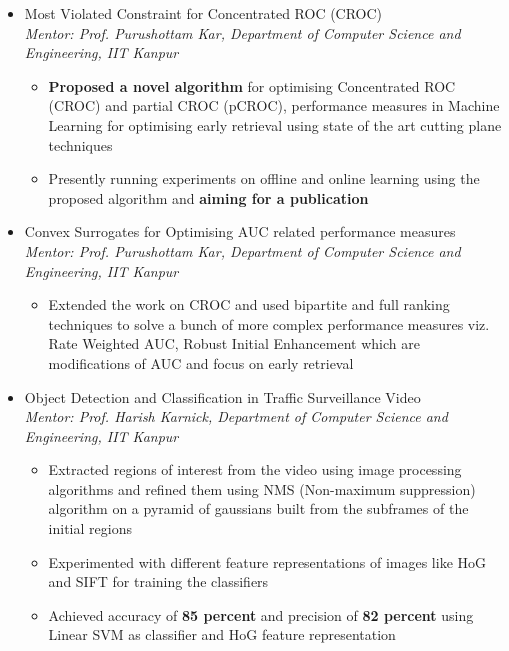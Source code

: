 \documentclass{article}
\begin{document}
\renewcommand{\labelitemii}{$\bullet$}
\begin{itemize}[leftmargin=0.07cm]
\item[] {\large Most Violated Constraint for Concentrated ROC (CROC)}\hspace*{\fill}\\
\emph{Mentor: Prof. Purushottam Kar, Department of Computer Science and Engineering, IIT Kanpur
}	\begin{itemize}
	\item \textbf{Proposed a novel algorithm} for optimising Concentrated ROC (CROC) and partial CROC (pCROC), performance measures in Machine Learning for optimising early retrieval using state of the art cutting plane techniques
	\item Presently running experiments on offline and online learning using the proposed algorithm and \textbf{aiming for a publication}
	\end{itemize}
\end{itemize}\begin{itemize}[leftmargin=0.07cm]
\item[] {\large Convex Surrogates for Optimising AUC related performance measures}\hspace*{\fill}\\
\emph{Mentor: Prof. Purushottam Kar, Department of Computer Science and Engineering, IIT Kanpur
}	\begin{itemize}
	\item Extended the work on CROC and used bipartite and full ranking techniques to solve a bunch of more complex performance measures viz. Rate Weighted AUC, Robust Initial Enhancement which are modifications of AUC and focus on early retrieval
	\end{itemize}
\item[] {\large Object Detection and Classification in Traffic Surveillance Video}\hspace*{\fill}\\
\emph{Mentor: Prof. Harish Karnick, Department of Computer Science and Engineering, IIT Kanpur
}	\begin{itemize}
	\item Extracted regions of interest from the video using image processing algorithms and refined them using NMS
(Non-maximum suppression) algorithm on a pyramid of gaussians built from the subframes of the initial regions
	\item Experimented with different feature representations of images like HoG and SIFT for training the classifiers
	\item Achieved accuracy of \textbf{85 percent} and precision of \textbf{82 percent} using Linear SVM as classifier and HoG feature representation
	\end{itemize}
\end{itemize}
\end{document}
